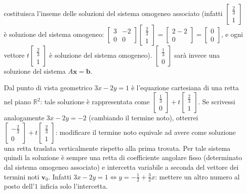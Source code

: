 \documentclass{article}
\begin{document}
\begin{enumerate}
\begin{enumerate}
costituisca l'inseme delle soluzioni del sistema omogeneo associato (infatti 
$\left[ 
\begin{array}{c}
\frac{2}{3} \\ 
1%
\end{array}%
\right] $ \`{e} soluzione del sistema omogeneo: $\left[ 
\begin{array}{cc}
3 & -2 \\ 
0 & 0%
\end{array}%
\right] \left[ 
\begin{array}{c}
\frac{2}{3} \\ 
1%
\end{array}%
\right] =\left[ 
\begin{array}{c}
2-2 \\ 
0%
\end{array}%
\right] =\left[ 
\begin{array}{c}
0 \\ 
0%
\end{array}%
\right] $, e ogni vettore $t\left[ 
\begin{array}{c}
\frac{2}{3} \\ 
1%
\end{array}%
\right] $ \`{e} soluzione del sistema omogeneo). $\left[ 
\begin{array}{c}
\frac{1}{3} \\ 
0%
\end{array}%
\right] $ sar\`{a} invece una soluzione del sistema $A\mathbf{x}=\mathbf{b}$.

Dal punto di vista geometrico $3x-2y=1$ \`{e} l'equazione cartesiana di una
retta nel piano $%
\mathbb{R}
^{2}$: tale soluzione \`{e} rappresentata come $\left[ 
\begin{array}{c}
\frac{1}{3} \\ 
0%
\end{array}%
\right] +t\left[ 
\begin{array}{c}
\frac{2}{3} \\ 
1%
\end{array}%
\right] $. Se scrivessi analogamente $3x-2y=-2$ (cambiando il termine noto),
otterrei $\left[ 
\begin{array}{c}
-\frac{2}{3} \\ 
0%
\end{array}%
\right] +t\left[ 
\begin{array}{c}
\frac{2}{3} \\ 
1%
\end{array}%
\right] $: modificare il termine noto equivale ad avere come soluzione una
retta traslata verticalmente rispetto alla prima trovata. Per tale sistema
quindi la soluzione \`{e} sempre una retta di coefficiente angolare fisso
(determinato dal sistema omogeneo associato) e intercetta variabile a
seconda del vettore dei termini noti $\mathbf{v}_{0}$. Infatti $%
3x-2y=1\Longleftrightarrow y=-\frac{1}{2}+\frac{3}{2}x$: mettere un altro
numero al posto dell'$1$ inficia solo l'intercetta.
\end{enumerate}


\end{enumerate}
\end{document}
